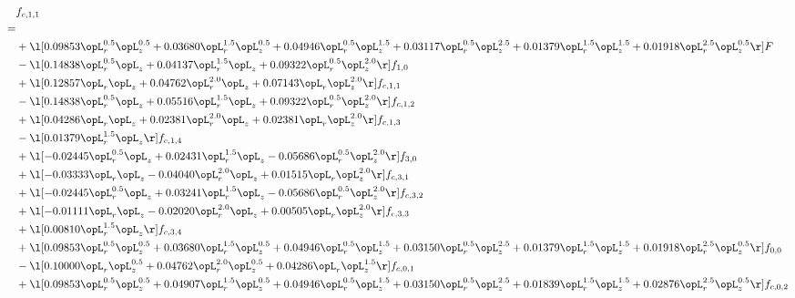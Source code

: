 \begin{alignat}{2} 
\label{eq:f_11_1} 
& f_{c,1,1} \nonumber \\ 
 = \\ 
& + \l[  0.09853 \opL_r^{0.5} \opL_z^{0.5} +  0.03680 \opL_r^{1.5} \opL_z^{0.5} +  0.04946 \opL_r^{0.5} \opL_z^{1.5} +  0.03117 \opL_r^{0.5} \opL_z^{2.5} +  0.01379 \opL_r^{1.5} \opL_z^{1.5} +  0.01918 \opL_r^{2.5} \opL_z^{0.5}  \r] F \nonumber \\ 
& - \l[  0.14838 \opL_r^{0.5} \opL_z +  0.04137 \opL_r^{1.5} \opL_z +  0.09322 \opL_r^{0.5} \opL_z^{2.0}  \r] f_{1,0} \nonumber \\ 
& + \l[  0.12857 \opL_r \opL_z +  0.04762 \opL_r^{2.0} \opL_z +  0.07143 \opL_r \opL_z^{2.0}  \r] f_{c,1,1} \nonumber \\ 
& - \l[  0.14838 \opL_r^{0.5} \opL_z +  0.05516 \opL_r^{1.5} \opL_z +  0.09322 \opL_r^{0.5} \opL_z^{2.0}  \r] f_{c,1,2} \nonumber \\ 
& + \l[  0.04286 \opL_r \opL_z +  0.02381 \opL_r^{2.0} \opL_z +  0.02381 \opL_r \opL_z^{2.0}  \r] f_{c,1,3} \nonumber \\ 
& - \l[  0.01379 \opL_r^{1.5} \opL_z  \r] f_{c,1,4} \nonumber \\ 
& + \l[  -0.02445 \opL_r^{0.5} \opL_z +  0.02431 \opL_r^{1.5} \opL_z   -0.05686 \opL_r^{0.5} \opL_z^{2.0}  \r] f_{3,0} \nonumber \\ 
& + \l[  -0.03333 \opL_r \opL_z   -0.04040 \opL_r^{2.0} \opL_z +  0.01515 \opL_r \opL_z^{2.0}  \r] f_{c,3,1} \nonumber \\ 
& + \l[  -0.02445 \opL_r^{0.5} \opL_z +  0.03241 \opL_r^{1.5} \opL_z   -0.05686 \opL_r^{0.5} \opL_z^{2.0}  \r] f_{c,3,2} \nonumber \\ 
& + \l[  -0.01111 \opL_r \opL_z   -0.02020 \opL_r^{2.0} \opL_z +  0.00505 \opL_r \opL_z^{2.0}  \r] f_{c,3,3} \nonumber \\ 
& + \l[  0.00810 \opL_r^{1.5} \opL_z  \r] f_{c,3,4} \nonumber \\ 
& + \l[  0.09853 \opL_r^{0.5} \opL_z^{0.5} +  0.03680 \opL_r^{1.5} \opL_z^{0.5} +  0.04946 \opL_r^{0.5} \opL_z^{1.5} +  0.03150 \opL_r^{0.5} \opL_z^{2.5} +  0.01379 \opL_r^{1.5} \opL_z^{1.5} +  0.01918 \opL_r^{2.5} \opL_z^{0.5}  \r] f_{0,0} \nonumber \\ 
& - \l[  0.10000 \opL_r \opL_z^{0.5} +  0.04762 \opL_r^{2.0} \opL_z^{0.5} +  0.04286 \opL_r \opL_z^{1.5}  \r] f_{c,0,1} \nonumber \\ 
& + \l[  0.09853 \opL_r^{0.5} \opL_z^{0.5} +  0.04907 \opL_r^{1.5} \opL_z^{0.5} +  0.04946 \opL_r^{0.5} \opL_z^{1.5} +  0.03150 \opL_r^{0.5} \opL_z^{2.5} +  0.01839 \opL_r^{1.5} \opL_z^{1.5} +  0.02876 \opL_r^{2.5} \opL_z^{0.5}  \r] f_{c,0,2} \nonumber \\ 

\end{alignat}
